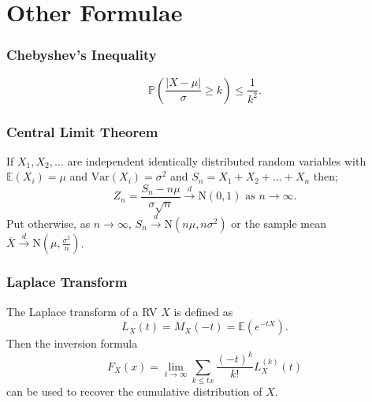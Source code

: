\documentclass[titlepage,twocolumn]{article}
\begin{document}
\section*{Other Formulae}
\subsubsection*{Chebyshev's Inequality}
$$\mathbb{P}\left(\frac{|X-\mu|}{\sigma} \geq k\right) \leq \frac{1}{k^2}.$$
\subsubsection*{Central Limit Theorem}
If $X_1, X_2,\dots$ are independent identically distributed random variables with $\mathbb{E}(X_i)=\mu$ and $\mbox{Var}(X_i)=\sigma^2$ and $S_n = X_1 + X_2 + \dots + X_n$ then;
$$Z_n = \frac{S_n - n\mu}{\sigma \sqrt{n}} \stackrel{d}{\rightarrow} \mbox{N}(0,1) \mbox{ as } n\rightarrow \infty.$$ Put otherwise, as $n \rightarrow \infty$, $S_n \stackrel{d}{\rightarrow} \mbox{N}(n\mu, n\sigma^2)$ or the sample mean $\overline{X} \stackrel{d}{\rightarrow} \mbox{N}(\mu, \frac{\sigma^2}{n})$.
\subsubsection*{Laplace Transform}
The Laplace transform of a RV $X$ is defined as $$L_X(t)=M_X(-t)=\mathbb{E}(e^{-tX}).$$ Then the inversion formula $$F_X(x) = \lim_{t\rightarrow \infty} \sum_{k\leq tx} \frac{(-t)^k}{k!}L_X^{(k)}(t)$$ can be used to recover the cumulative distribution of $X$.
\end{document}
